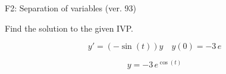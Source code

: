 \begin{exercise}
  \begin{exerciseTitle}F2: Separation of variables (ver. 93)\end{exerciseTitle}
  \begin{exerciseStatement}
    
Find the solution to the given IVP.

    
\[y'=( -\sin\left(t\right) )y\hspace{1em} y(0)= -3 \, e\]

  \end{exerciseStatement}
  \begin{exerciseAnswer}
    
\[y= -3 \, e^{\cos\left(t\right)}\]

  \end{exerciseAnswer}
\end{exercise}